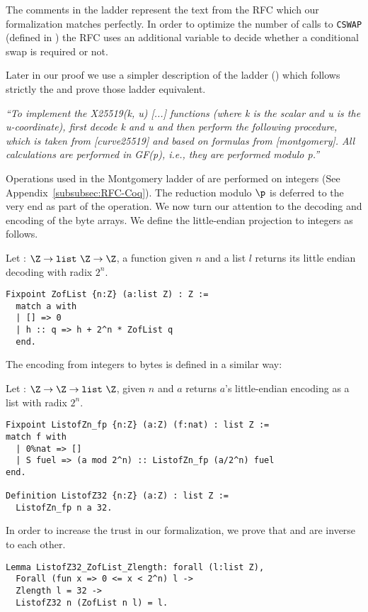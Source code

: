 The comments in the ladder represent the text from the RFC which
our formalization matches perfectly. In order to optimize the
number of calls to \texttt{CSWAP} (defined in )
the RFC uses an additional variable to decide whether a conditional swap
is required or not.

Later in our proof we use a simpler description of the ladder
() which follows strictly the 
and prove those ladder equivalent.

\emph{``To implement the X25519(k, u) [...] functions (where k is
the scalar and u is the u-coordinate), first decode k and u and then
perform the following procedure, which is taken from [curve25519] and
based on formulas from [montgomery].  All calculations are performed
in GF(p), i.e., they are performed modulo p.''}~\cite{rfc7748}

Operations used in the Montgomery ladder of  are performed on
integers (See Appendix~\ref{subsubsec:RFC-Coq}).
The reduction modulo $\p$ is deferred to the very end as part of the
 operation. We now turn our attention to the decoding and encoding of the byte arrays.
We define the little-endian projection to integers as follows.
\begin{dfn}
Let  : $\Z \rightarrow \texttt{list}~\Z \rightarrow \Z$,
a function given $n$ and a list $l$ returns its little endian decoding with radix $2^n$.
\end{dfn}
\begin{lstlisting}[language=Coq,aboveskip=0pt,belowskip=1pt]
Fixpoint ZofList {n:Z} (a:list Z) : Z :=
  match a with
  | [] => 0
  | h :: q => h + 2^n * ZofList q
  end.
\end{lstlisting}

The encoding from integers to bytes is defined in a similar way:
\begin{dfn}
Let  : $\Z \rightarrow \Z \rightarrow \texttt{list}~\Z$, given
$n$ and $a$ returns $a$'s little-endian encoding as a list with radix $2^n$.
\end{dfn}
\begin{lstlisting}[language=Coq,aboveskip=0pt,belowskip=1pt]
Fixpoint ListofZn_fp {n:Z} (a:Z) (f:nat) : list Z :=
match f with
  | 0%nat => []
  | S fuel => (a mod 2^n) :: ListofZn_fp (a/2^n) fuel
end.

Definition ListofZ32 {n:Z} (a:Z) : list Z :=
  ListofZn_fp n a 32.
\end{lstlisting}
In order to increase the trust in our formalization, we prove that
 and  are inverse to each other.
\begin{lstlisting}[language=Coq,aboveskip=0pt,belowskip=1pt]
Lemma ListofZ32_ZofList_Zlength: forall (l:list Z),
  Forall (fun x => 0 <= x < 2^n) l ->
  Zlength l = 32 ->
  ListofZ32 n (ZofList n l) = l.
\end{lstlisting}

